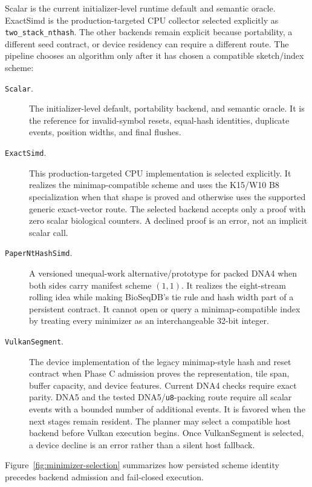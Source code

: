 Scalar is the current initializer-level runtime default and semantic oracle.
ExactSimd is the production-targeted CPU collector selected explicitly as
\texttt{two\_stack\_nthash}. The other backends remain explicit because
portability, a different seed contract, or device residency can require a
different route. The pipeline chooses an algorithm only after it has chosen a
compatible sketch/index scheme:

\begin{description}
  \item[\texttt{Scalar}.] The initializer-level default, portability backend,
  and semantic oracle. It is the reference for invalid-symbol resets,
  equal-hash identities, duplicate events, position widths, and final flushes.

  \item[\texttt{ExactSimd}.] This production-targeted CPU implementation is
  selected explicitly. It realizes the minimap-compatible scheme and uses the K15/W10
  B8 specialization when that shape is proved and otherwise uses the supported
  generic exact-vector route. The selected backend accepts only a proof with
  zero scalar biological counters. A declined proof is an error, not an
  implicit scalar call.

  \item[\texttt{PaperNtHashSimd}.] A versioned unequal-work
  alternative/prototype for packed DNA4 when both sides carry manifest scheme
  $(1,1)$. It realizes the eight-stream rolling idea while making BioSeqDB's
  tie rule and hash width part of a persistent contract. It cannot open or
  query a minimap-compatible index by treating every minimizer as an
  interchangeable 32-bit integer.

  \item[\texttt{VulkanSegment}.] The device implementation of the legacy
  minimap-style hash and reset contract when Phase C admission proves the
  representation, tile span, buffer capacity, and device features. Current
  DNA4 checks require exact parity. DNA5 and the tested DNA5/\texttt{u8}-packing route
  require all scalar events with a bounded number of additional events. It is
  favored when the next stages remain resident. The planner may select a
  compatible host backend before Vulkan execution begins. Once VulkanSegment
  is selected, a device decline is an error rather than a silent host fallback.
\end{description}

Figure~\ref{fig:minimizer-selection} summarizes how persisted scheme identity
precedes backend admission and fail-closed execution.

